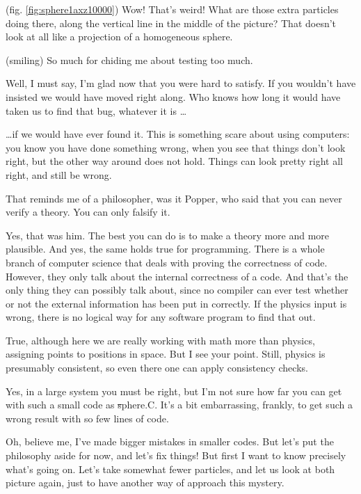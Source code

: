 \abc

\carol
(fig. \ref{fig:sphere1axz10000}) 
Wow!  That's weird!  What are those extra particles doing there, along
the vertical line in the middle of the picture?  That doesn't look at
all like a projection of a homogeneous sphere.

\bob
(smiling) So much for chiding me about testing too much.

\carol
Well, I must say, I'm glad now that you were hard to satisfy.  If you
wouldn't have insisted we would have moved right along.  Who knows how
long it would have taken us to find that bug, whatever it is \dots

\alice
\dots if we would have ever found it.  This is something scare about
using computers: you know you have done something wrong, when you see
that things don't look right, but the other way around does not hold.
Things can look pretty right all right, and still be wrong.

\bob
That reminds me of a philosopher, was it Popper, who said that you can
never verify a theory.  You can only falsify it.

\carol
Yes, that was him.  The best you can do is to make a theory more and
more plausible.  And yes, the same holds true for programming.  There
is a whole branch of computer science that deals with proving the
correctness of code.  However, they only talk about the internal
correctness of a code.  And that's the only thing they can possibly
talk about, since no compiler can ever test whether or not the
external information has been put in correctly.  If the physics input
is wrong, there is no logical way for any software program to find
that out.

\bob
True, although here we are really working with math more than physics,
assigning points to positions in space.  But I see your point.  Still,
physics is presumably consistent, so even there one can apply
consistency checks.

\carol
Yes, in a large system you must be right, but I'm not sure how far you
can get with such a small code as {\st sphere.C}.  It's a bit
embarrassing, frankly, to get such a wrong result with so few lines of
code.

\alice
Oh, believe me, I've made bigger mistakes in smaller codes.  But let's
put the philosophy aside for now, and let's fix things!  But first I
want to know precisely what's going on.  Let's take somewhat fewer
particles, and let us look at both picture again, just to have
another way of approach this mystery.

